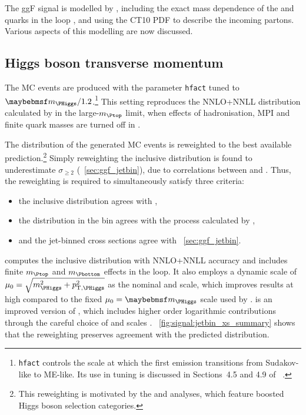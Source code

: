 
The ggF signal is modelled by , including the exact mass 
dependence of the \Ptop and \Pbottom quarks in the loop \cite{Powheg-ggF-quarkmasses}, and 
using the CT10 PDF \cite{CTEQ} to describe the incoming partons. Various aspects of this 
modelling are now discussed.



\subsection{Higgs boson transverse momentum}
\label{sec:ggF:pt}

The MC events are produced with the \powhegbox parameter \verb|hfact| tuned to 
$\mH/1.2$.\footnote{
	\texttt{hfact} controls the scale at which the first emission transitions from 
	Sudakov-like to ME-like. Its use in tuning \ptH is discussed in Sections~4.5 and 4.9 of 
	\Reference~\cite{YR2}.
}
This setting reproduces the NNLO+NNLL \ptH distribution calculated by \hqt \cite{HqT2} in 
the large-$m_{\Ptop}$ limit, when effects of hadronisation, MPI and finite quark masses are 
turned off in .

The \ptH distribution of the generated MC events is reweighted to the best available 
prediction.\footnote{
	This \ptH reweighting is motivated by the \HepProcess{\PHiggs \HepTo \Pphoton\Pphoton} 
	and \HepProcess{\PHiggs \HepTo \Ptau\Ptau} analyses, which feature boosted Higgs boson 
	selection categories.
}
Simply reweighting the inclusive \ptH distribution is found to underestimate $\sigma_{\geq2}$
(\cf \Section~\ref{sec:ggf_jetbin}), due to correlations between \ptH and \njets. 
Thus, the reweighting is required to simultaneously satisfy three criteria:
\begin{itemize}[noitemsep,nolistsep]
	\item the inclusive \ptH distribution agrees with \hres \cite{HRes},
	\item the \ptH distribution in the \twojet bin agrees with the 
	 process calculated by 
	 \cite{Minlo:Hjj},
	\item and the jet-binned cross sections agree with \Section~\ref{sec:ggf_jetbin}.
\end{itemize}
\hres computes the inclusive \ptH distribution with NNLO+NNLL accuracy and includes finite 
$m_{\Ptop}$ and $m_{\Pbottom}$ effects in the loop. It also employs a dynamic scale of 
$\mu_0 = \sqrt{m_{\PHiggs}^2 + p_{\text{T,\PHiggs}}^2}$ as the nominal \mur and \muf scale, 
which improves results at high \ptH compared to the fixed $\mu_0 = \mH$ scale used by \hqt.
\minlo is an improved version of \powhegbox, which includes higher order logarithmic 
contributions through the careful choice of \mur and \muf scales \cite{Minlo:Hjj}. 
\Figure~\ref{fig:signal:jetbin_xs_summary} shows that the reweighting preserves agreement 
with the predicted \njets distribution.




